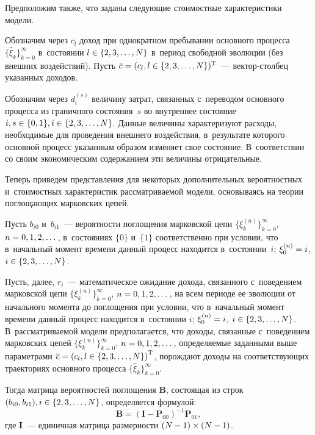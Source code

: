 \begin{multicols}{2}
Предположим также, что заданы следующие стоимостные
характеристики модели.

Обозначим через $c_{l}$ доход при однократном пребывании основного процесса 
$\{\widehat{\xi}_k\}_{k=0}^{\infty}$ в~со\-сто\-янии $l\hm\in\lbrace 
2,3,\ldots ,N\rbrace $ в~период
свободной эволюции (без внеш\-них воздействий). Пусть $\bar{c}\hm=(c_{l},l\hm\in\lbrace 2,3,\ldots ,N\rbrace )^{\mathrm{T}}$~--- век\-тор-стол\-бец
указанных доходов.

Обозначим через $d_{i}^{(s)}$ величину за\-трат, связанных с~переводом основного
процесса из граничного со\-сто\-яния~$s$ во
внутреннее со\-сто\-яние~$i, s\hm\in\lbrace 0,1\rbrace , i\hm\in\lbrace
2,3,\ldots ,N\rbrace $. Данные величины \mbox{характеризуют} расходы, необходимые для 
проведения внеш\-не\-го воздействия, в~результате которого основной процесс 
указанным образом изменяет свое со\-сто\-яние. В~соответствии со своим экономическим 
содержанием эти величины отрицательные.

Теперь приведем представления для некоторых дополнительных вероятностных 
и~стоимостных характеристик рас\-смат\-ри\-ва\-емой модели, основываясь на тео\-рии 
поглощающих марковских цепей.

Пусть $b_{i0}$ и~$b_{i1}$~--- вероятности по\-гло\-ще\-ния марковской цепи $\{ \xi 
_{k}^{(n)}\}_{k=0}^{\infty}$, $n\hm=
0,1,2,\dots$, в~состояниях $\lbrace 0\rbrace $ и~$\lbrace
1\rbrace $ соответственно при условии, что в~начальный момент времени
данный процесс находится в~со\-сто\-янии~$i$; $ \xi _{0}^{(n)}\hm=i$,
$i\hm\in\lbrace 2,3,\ldots ,N\rbrace $.

Пусть, далее, $r_{i}$~--- математическое ожидание дохода, связанного с~поведением
марковской цепи $\{ \xi _{k}^{(n)} \}_{k=0}^{\infty}$, $n \hm= 
0,1,2,\dots$, на всем периоде ее эволюции от начального момента до
поглощения при условии, что в~начальный момент времени данный процесс
находится в~со\-сто\-янии $i$; $ \xi _{0}^{(n)}\hm=i$, $i\hm\in\lbrace 2,3,\ldots
,N\rbrace $.
В~рассматриваемой модели предполагается, что доходы, связанные с~поведением 
марковских цепей $\{\xi_k^{(n)}\}_{k=0}^{\infty}$, $n\hm=0,1,2,\dots $, 
определяемые заданными выше па\-ра\-мет\-ра\-ми 
$\overline{c}\hm=\left(c_l, l\hm\in\{2,3,\dots,N\}\right)^{\mathrm{T}}$, по\-рож\-да\-ют 
доходы на со\-от\-вет\-ст\-ву\-ющих траекториях основного процесса 
$\{\widehat{\xi}_k\}_{k=0}^{\infty}$.

Тогда матрица вероятностей по\-гло\-ще\-ния $\textbf{B}$, состоящая из строк $(b_{i0}, 
b_{i1}), i\hm\in\lbrace 2,3,\ldots ,N\rbrace$, определяется формулой:
$$
\textbf{B}=(\textbf{I}-\textbf{P}_{00})^{-1}\textbf{P}_{01},
$$
где $\textbf{I}$~--- единичная мат\-ри\-ца раз\-мер\-ности $(N-1)\hm\times(N-1)$.


\end{multicols}
